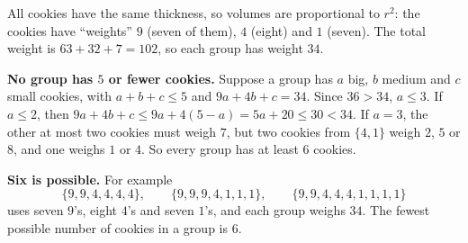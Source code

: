 All cookies have the same thickness, so volumes are proportional to $r^2$: the cookies have ``weights'' $9$ (seven of them), $4$ (eight) and $1$ (seven). The total weight is $63+32+7=102$, so each group has weight $34$.

\textbf{No group has $5$ or fewer cookies.} Suppose a group has $a$ big, $b$ medium and $c$ small cookies, with $a+b+c\le5$ and $9a+4b+c=34$. Since $36>34$, $a\le3$. If $a\le2$, then $9a+4b+c\le9a+4(5-a)=5a+20\le30<34$. If $a=3$, the other at most two cookies must weigh $7$, but two cookies from $\{4,1\}$ weigh $2$, $5$ or $8$, and one weighs $1$ or $4$. So every group has at least $6$ cookies.

\textbf{Six is possible.} For example
\[
\{9,9,4,4,4,4\},\qquad \{9,9,9,4,1,1,1\},\qquad \{9,9,4,4,4,1,1,1,1\}
\]
uses seven $9$'s, eight $4$'s and seven $1$'s, and each group weighs $34$. The fewest possible number of cookies in a group is $\boxed{6}$.
